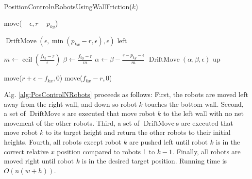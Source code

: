 \begin{algorithm}
\caption{PositionControl$n$RobotsUsingWallFriction($k$)}\label{alg:PosControlNRobots}
\begin{algorithmic}[1]
\State move( $-\epsilon, r-p_{ky}$) %


\State $\operatorname{DriftMove}(\epsilon, \min(p_{kx} - r,\epsilon), \epsilon)$ left   %
\EndWhile

\State $m \gets \operatorname{ceil}(\frac{f_{ky}-r}{\epsilon})$
\State $\beta \gets \frac{f_{ky}-r}{m}$
\State $\alpha \gets \beta - \frac{r - p_{ky}-\epsilon}{m}$
\State $\operatorname{DriftMove}(\alpha, \beta, \epsilon)$ up   %
\EndFor

\State move($r+\epsilon-f_{kx}, 0$)  %
\State move($f_{kx}-r, 0$)  

\end{algorithmic}
\end{algorithm}

Alg. \ref{alg:PosControlNRobots} proceeds as follows:  
First, the robots are moved left away from the right wall, and down so robot $k$ touches the bottom wall.
Second, a set of $\operatorname{DriftMove}$s are executed that move robot $k$ to the left wall with no net movement of the other robots.
Third, a set of $\operatorname{DriftMove}$s are executed that  move robot $k$ to its target height and return the other robots to their initial heights. 
Fourth, all robots except robot $k$ are pushed left until robot $k$ is in the correct relative $x$ position compared to robots 1 to $k-1$.
Finally, all robots are moved right until robot $k$ is in the desired target position. Running time is $O(n(w+h))$.


